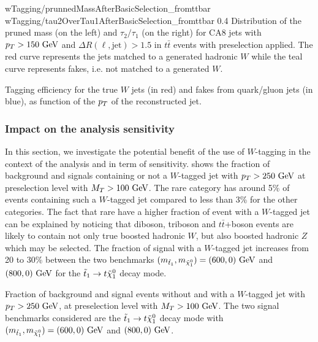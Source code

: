                      {wTagging/prunnedMassAfterBasicSelection_fromttbar}
                     {wTagging/tau2OverTau1AfterBasicSelection_fromttbar}
                     {0.4}
                     {Distribution of the pruned mass (on the left) and $\tau_2
                     / \tau_1$ (on the right) for CA8 jets with $p_T > 150~\text{GeV}$
                     and $\Delta R(\ell,\text{jet}) > 1.5$ in $t\bar{t}$ events
                     with preselection applied. The red curve represents the
                     jets matched to a generated hadronic $W$ while the teal
                     curve represents fakes, i.e. not matched to a generated
                     $W$.}

                 {Tagging efficiency for the true $W$ jets (in red) and fakes
                 from quark/gluon jets (in blue), as function of the $p_T$ of
                 the reconstructed jet.}

    \subsubsection{Impact on the analysis sensitivity}

    In this section, we investigate the potential benefit of the use of
    $W$-tagging in the context of the analysis and in term of sensitivity.
     shows the fraction of
    background and signals containing or not a $W$-tagged jet with $p_T >
    250~\text{GeV}$ at preselection level with $M_T > 100~\text{GeV}$. The rare category has
    around 5\% of events containing such a $W$-tagged jet compared to less than
    3\% for the other categories. The fact that rare have a higher fraction of
    event with a $W$-tagged jet can be explained by noticing that diboson,
    triboson and $t\bar{t}$+boson events are likely to contain not only true
    boosted hadronic $W$, but also boosted hadronic $Z$ which may be selected.
    The fraction of signal with a $W$-tagged jet increases from 20 to 30\%
    between the two benchmarks $(m_{\tilde{t}_1},m_{\tilde{\chi}_1^0}) = (600,0)
    ~\text{GeV}$ and $(800,0) ~\text{GeV}$ for the $\tilde{t}_1 \rightarrow t \tilde{\chi}_1^0$ decay
    mode.

                 {Fraction of background and signal events without and with a
                 $W$-tagged jet with $p_T > 250~\text{GeV}$, at preselection level with
                 $M_T > 100~\text{GeV}$. The two signal benchmarks considered are the
                 $\tilde{t}_1 \rightarrow t \tilde{\chi}_1^0$ decay mode with
                 $(m_{\tilde{t}_1},m_{\tilde{\chi}_1^0}) = (600,0)~\text{GeV}$ and
                 $(800,0)~\text{GeV}$.}

